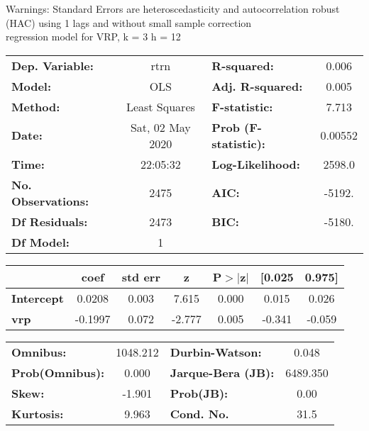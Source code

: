 Warnings: \newline
 [1] Standard Errors are heteroscedasticity and autocorrelation robust (HAC) using 1 lags and without small sample correction\\ 

regression model for VRP, k = 3 h = 12\begin{center}
\begin{tabular}{lclc}
\toprule
\textbf{Dep. Variable:}    &       rtrn       & \textbf{  R-squared:         } &     0.006   \\
\textbf{Model:}            &       OLS        & \textbf{  Adj. R-squared:    } &     0.005   \\
\textbf{Method:}           &  Least Squares   & \textbf{  F-statistic:       } &     7.713   \\
\textbf{Date:}             & Sat, 02 May 2020 & \textbf{  Prob (F-statistic):} &  0.00552    \\
\textbf{Time:}             &     22:05:32     & \textbf{  Log-Likelihood:    } &    2598.0   \\
\textbf{No. Observations:} &        2475      & \textbf{  AIC:               } &    -5192.   \\
\textbf{Df Residuals:}     &        2473      & \textbf{  BIC:               } &    -5180.   \\
\textbf{Df Model:}         &           1      & \textbf{                     } &             \\
\bottomrule
\end{tabular}
\begin{tabular}{lcccccc}
                   & \textbf{coef} & \textbf{std err} & \textbf{z} & \textbf{P$> |$z$|$} & \textbf{[0.025} & \textbf{0.975]}  \\
\midrule
\textbf{Intercept} &       0.0208  &        0.003     &     7.615  &         0.000        &        0.015    &        0.026     \\
\textbf{vrp}       &      -0.1997  &        0.072     &    -2.777  &         0.005        &       -0.341    &       -0.059     \\
\bottomrule
\end{tabular}
\begin{tabular}{lclc}
\textbf{Omnibus:}       & 1048.212 & \textbf{  Durbin-Watson:     } &    0.048  \\
\textbf{Prob(Omnibus):} &   0.000  & \textbf{  Jarque-Bera (JB):  } & 6489.350  \\
\textbf{Skew:}          &  -1.901  & \textbf{  Prob(JB):          } &     0.00  \\
\textbf{Kurtosis:}      &   9.963  & \textbf{  Cond. No.          } &     31.5  \\
\bottomrule
\end{tabular}
\end{center}

